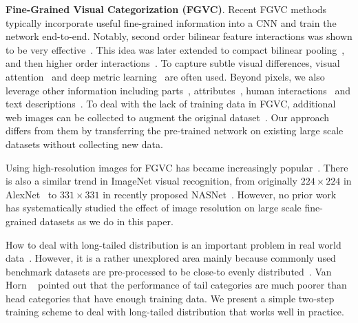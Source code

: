 \documentclass[10pt,twocolumn,letterpaper]{article}
\begin{document}
\textbf{Fine-Grained Visual Categorization (FGVC)}.
Recent FGVC methods typically incorporate useful fine-grained information into a CNN and train the network end-to-end.
Notably, second order bilinear feature interactions was shown to be very effective~\cite{bilinearcnn}.
This idea was later extended to compact bilinear pooling~\cite{cbp}, and then higher order interactions~\cite{kernel_pooling, cai2017higher-order, simon2017generalized}.
To capture subtle visual differences, visual attention~\cite{two-level_attention, fu2017look, multi-attention_fgvc} and deep metric learning~\cite{facenet, cui2016fine} are often used.
Beyond pixels, we also leverage other information including parts~\cite{zhang2014part, pose_normlized_net, zhang2015fine}, attributes~\cite{fine-grained_attributes, gebru2017fine}, human interactions~\cite{branson2010visual, deng2016leveraging} and text descriptions~\cite{fine-grained_description, he2017fine}.
To deal with the lack of training data in FGVC, additional web images can be collected to augment the original dataset~\cite{cui2016fine, krause2016unreasonable, xu2016webly, gebru2017fine}.
Our approach differs from them by transferring the pre-trained network on existing large scale datasets without collecting new data.

Using high-resolution images for FGVC has became increasingly popular~\cite{STN,bilinearcnn}.
There is also a similar trend in ImageNet visual recognition, from originally $224 \times 224$ in AlexNet~\cite{alexnet} to $331 \times 331$ in recently proposed NASNet~\cite{nasnet}.
However, no prior work has systematically studied the effect of image resolution on large scale fine-grained datasets as we do in this paper.

How to deal with long-tailed distribution is an important problem in real world data~\cite{long-tail_object, van2017devil}.
However, it is a rather unexplored area mainly because commonly used benchmark datasets are pre-processed to be close-to evenly distributed~\cite{imagenet, coco}.
Van Horn \etal~\cite{van2017devil} pointed out that the performance of tail categories are much poorer than head categories that have enough training data.
We present a simple two-step training scheme to deal with long-tailed distribution that works well in practice.
\end{document}
